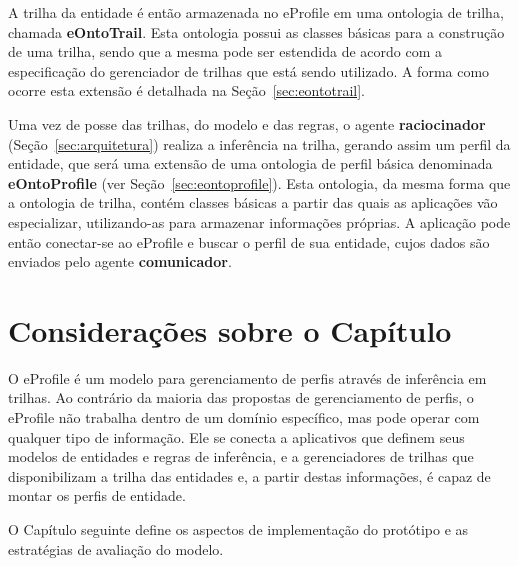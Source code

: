 A trilha da entidade é então armazenada no eProfile em uma ontologia de trilha, chamada {\bf eOntoTrail}. Esta ontologia possui as classes básicas para a construção de uma trilha, sendo que a mesma pode ser estendida de acordo com a especificação do gerenciador de trilhas que está sendo utilizado. A forma como ocorre esta extensão é detalhada na Seção~\ref{sec:eontotrail}.

Uma vez de posse das trilhas, do modelo e das regras, o agente \textbf{raciocinador} (Seção~\ref{sec:arquitetura}) realiza a inferência na trilha, gerando assim um perfil da entidade, que será uma extensão de uma ontologia de perfil básica denominada {\bf eOntoProfile} (ver Seção~\ref{sec:eontoprofile}). Esta ontologia, da mesma forma que a ontologia de trilha, contém classes básicas a partir das quais as aplicações vão especializar, utilizando-as para armazenar informações próprias. A aplicação pode então conectar-se ao eProfile e buscar o perfil de sua entidade, cujos dados são enviados pelo agente \textbf{comunicador}.








\section{Considerações sobre o Capítulo}
\label{sec:consideracoes_modelo}

O eProfile é um modelo para gerenciamento de perfis através de inferência em trilhas. Ao contrário da maioria das propostas de gerenciamento de perfis, o eProfile não trabalha dentro de um domínio específico, mas pode operar com qualquer tipo de informação. Ele se conecta a aplicativos que definem seus modelos de entidades e regras de inferência, e a gerenciadores de trilhas que disponibilizam a trilha das entidades e, a partir destas informações, é capaz de montar os perfis de entidade.

O Capítulo seguinte define os aspectos de implementação do protótipo e as estratégias de avaliação do modelo.

